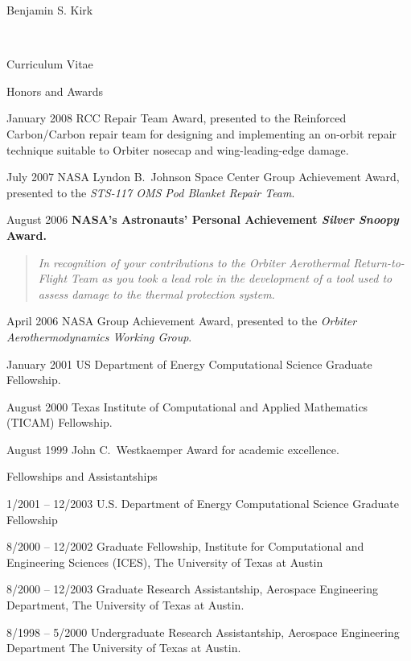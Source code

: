 \documentclass[10pt]{report}
\begin{document}
\begin{cv}{\centerline{\Large Benjamin S. Kirk}\\
    \centerline{\large Curriculum Vitae}}
\begin{cvlist}{Honors and Awards}
    \item[January 2008]
     RCC Repair Team Award, presented to the Reinforced Carbon/Carbon repair team for designing and implementing an on-orbit repair technique suitable to Orbiter nosecap and wing-leading-edge damage.

    \item[July 2007]
      NASA Lyndon B.~Johnson Space Center Group Achievement Award, presented to the {\em STS-117 OMS Pod Blanket Repair Team}.

    \item[August 2006]
      \textbf{NASA's Astronauts' Personal Achievement {\em Silver Snoopy} Award.}

      \begin{quote}
        \em In recognition of your contributions to the Orbiter Aerothermal Return-to-Flight Team as you took a lead role in the development of a tool used to assess damage to the thermal protection system.
      \end{quote}

    \item[April 2006]
      NASA Group Achievement Award, presented to the {\em Orbiter Aerothermodynamics Working Group}.

    \item[January 2001]
      US Department of Energy Computational Science Graduate Fellowship.

    \item[August 2000]
      Texas Institute of Computational and Applied Mathematics (TICAM) Fellowship.

    \item[August 1999]
      John C.\ Westkaemper Award for academic excellence.
  \end{cvlist}


  \begin{cvlist}{Fellowships and Assistantships}
    \item[1/2001 -- 12/2003]
      U.S. Department of Energy Computational Science Graduate Fellowship
    \item[8/2000 -- 12/2002]
      Graduate Fellowship,
      Institute for Computational and Engineering Sciences (ICES),
      The University of Texas at Austin
    \item[8/2000 -- 12/2003]
      Graduate Research Assistantship,
      Aerospace Engineering Department,
      The University of Texas at Austin.
    \item[8/1998 -- 5/2000]
      Undergraduate Research Assistantship,
      Aerospace Engineering Department
      The University of Texas at Austin.
  \end{cvlist}



\end{cv}
\end{document}
